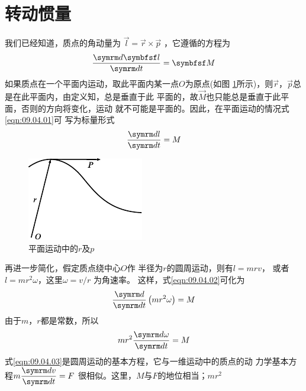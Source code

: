 \section{转动惯量}\label{sec:09.04}

我们已经知道，质点的角动量为 $ \vec{ l } = \vec{ r } \times  \vec{ p }$  ，它遵循的方程为
\begin{equation}\label{eqn:09.04.01}
  \frac { \dif \vec{l} } { \dif t } = \vec{M}
\end{equation}
如果质点在一个平面内运动，取此平面内某一点$ O $为原点(如图
\ref{fig:09.10}所示)，则$ \vec{ r } $，$ \vec{ p } $总是在此平面内，由定义知，总是垂直于此
平面的，故$ \vec{M} $也只能总是垂直于此平面，否则的方向将变化，运动
\clearpage\noindent
就不可能是平面的。因此，在平面运动的情况\lhbrak  式\eqref{eqn:09.04.01}\rhbrak 可
写为标量形式
\begin{equation}\label{eqn:09.04.02}
  \frac { \dif l } { \dif t } = M
\end{equation}
\begin{figure}
    \centering
    \includegraphics{figure/fig09.10}
    \caption{平面运动中的$ r $及$ p $}
    \label{fig:09.10}
\end{figure}
再进一步简化，假定质点绕中心$ O $作
半径为$ r $的圆周运动，则有$  l = m r v   $，
或者$  l = m r ^ { 2 } \omega   $，这里$  \omega = v / r $ 为角速率。
这样，式\eqref{eqn:09.04.02}可化为
\begin{equation*}
  \frac { \dif } { \dif t } \left( m r ^ { 2 } \omega \right) = M
\end{equation*}
由于$ m $，$ r $都是常数，所以
\begin{equation}\label{eqn:09.04.03}
  m r ^ { 2 } \frac { \dif \omega } { \dif t } = M
\end{equation}
式\eqref{eqn:09.04.03}是圆周运动的基本方程，它与一维运动中的质点的动
力学基本方程$ m \dfrac { \dif v } { \dif t } = F $ 很相似。这里，$ M $与$ F $的地位相当；$ m r ^ 2 $

